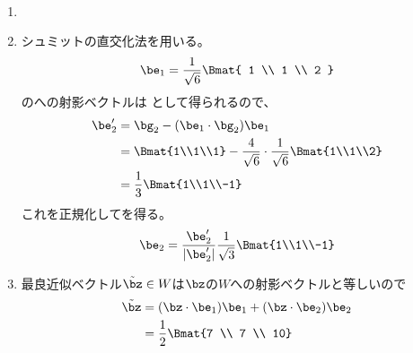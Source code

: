 \begin{ans*}
  ${}$
  \begin{enumerate}[label=(\arabic*)]
    \item {}
    \item シュミットの直交化法を用いる。
    \begin{align}
      \be_{1} = \frac{1}{\sqrt{6}}\Bmat{
        1 \\ 1 \\ 2
      }
    \end{align}
    のへの射影ベクトルは
    として得られるので、
    \begin{align}
      \be'_{2}
      &= \bg_{2} - (\be_{1}\cdot\bg_{2})\be_{1} \\
      &= \Bmat{1\\1\\1} - \frac{4}{\sqrt{6}}\cdot\frac{1}{\sqrt{6}}\Bmat{1\\1\\2} \\
      &= \frac{1}{3}\Bmat{1\\1\\-1}
    \end{align}
    これを正規化してを得る。
    \begin{gather}
      \be_{2} = \frac{\be'_{2}}{|\be'_{2}|}\frac{1}{\sqrt{3}}\Bmat{1\\1\\-1}
    \end{gather}
    \item 最良近似ベクトル$\tilde{\bz}\in W$は$\bz$の$W$への射影ベクトルと等しいので
    \begin{align}
      \tilde{\bz}
      &= (\bz\cdot \be_{1})\be_{1} + (\bz\cdot \be_{2})\be_{2} \\
      &= \frac{1}{2}\Bmat{7 \\ 7 \\ 10}
    \end{align}
  \end{enumerate}
\end{ans*}
